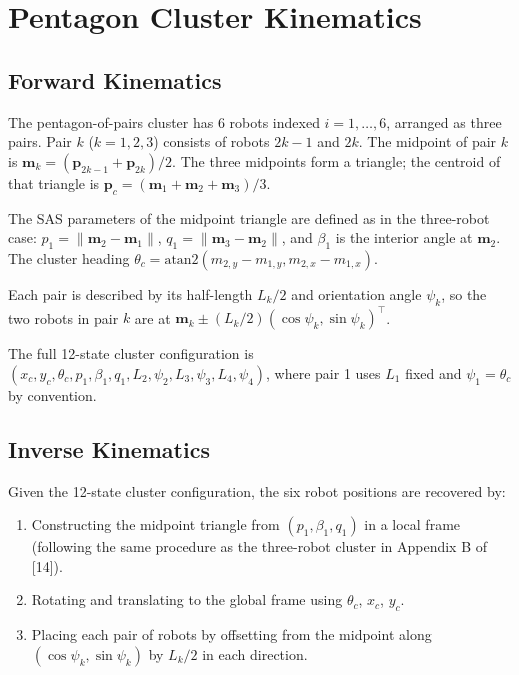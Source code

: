\documentclass[lettersize,journal]{IEEEtran}
\begin{document}
\section{Pentagon Cluster Kinematics}
\label{app:kinematics}

\subsection{Forward Kinematics}

The pentagon-of-pairs cluster has 6 robots indexed $i = 1, \ldots, 6$, arranged
as three pairs. Pair $k$ ($k = 1, 2, 3$) consists of robots $2k-1$ and $2k$.
The midpoint of pair $k$ is $\mathbf{m}_k = (\mathbf{p}_{2k-1} +
\mathbf{p}_{2k})/2$. The three midpoints form a triangle; the centroid of that
triangle is $\mathbf{p}_c = (\mathbf{m}_1 + \mathbf{m}_2 + \mathbf{m}_3)/3$.

The SAS parameters of the midpoint triangle are defined as in the three-robot
case: $p_1 = \|\mathbf{m}_2 - \mathbf{m}_1\|$, $q_1 = \|\mathbf{m}_3 -
\mathbf{m}_2\|$, and $\beta_1$ is the interior angle at $\mathbf{m}_2$.
The cluster heading $\theta_c = \text{atan2}(m_{2,y} - m_{1,y},
m_{2,x} - m_{1,x})$.

Each pair is described by its half-length $L_k/2$ and orientation angle
$\psi_k$, so the two robots in pair $k$ are at $\mathbf{m}_k \pm (L_k/2)
(\cos\psi_k, \sin\psi_k)^\top$.

The full 12-state cluster configuration is
$(x_c, y_c, \theta_c, p_1, \beta_1, q_1, L_2, \psi_2, L_3, \psi_3,
L_4, \psi_4)$, where pair 1 uses $L_1$ fixed and $\psi_1 = \theta_c$ by
convention.

\subsection{Inverse Kinematics}

Given the 12-state cluster configuration, the six robot positions are recovered
by:
\begin{enumerate}
    \item Constructing the midpoint triangle from $(p_1, \beta_1, q_1)$ in
          a local frame (following the same procedure as the three-robot
          cluster in Appendix B of [14]).
    \item Rotating and translating to the global frame using $\theta_c$,
          $x_c$, $y_c$.
    \item Placing each pair of robots by offsetting from the midpoint along
          $(\cos\psi_k, \sin\psi_k)$ by $L_k/2$ in each direction.
\end{enumerate}
\end{document}
